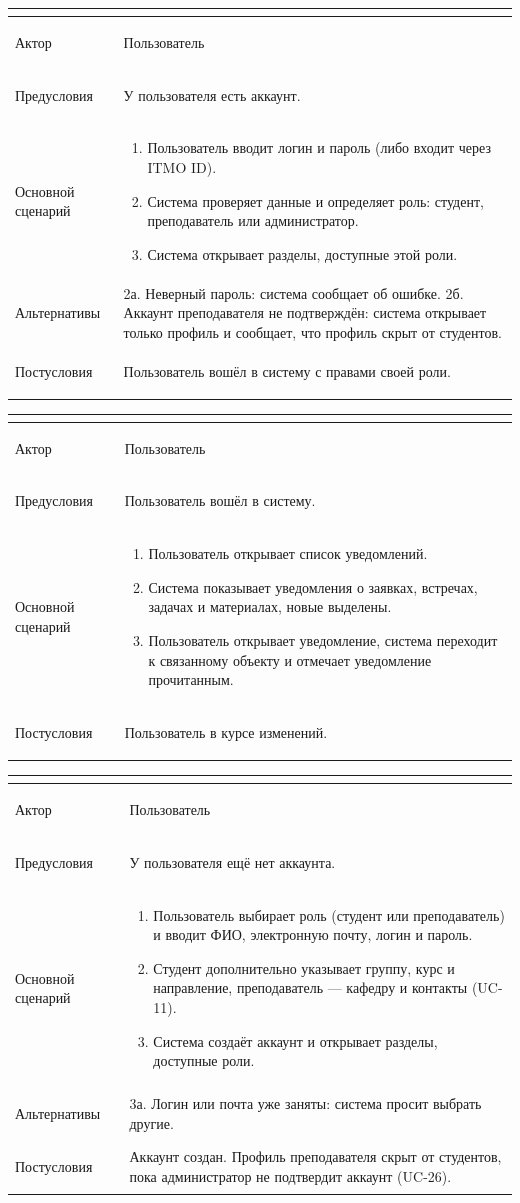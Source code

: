 \documentclass[a4paper,12pt]{article}
\newenvironment{ucd}[3]{%
  \needspace{10\baselineskip}
  \begin{longtable}{|>{\bfseries\raggedright\arraybackslash}p{3.0cm}|p{11.8cm}|}
  \hline
  \multicolumn{2}{|l|}{\textbf{#1.\ #2}}\\ \hline
  Актор & #3\\ \hline
}{\end{longtable}}
\newcommand{\steps}[1]{\begin{enumerate}[nosep,leftmargin=*]#1\end{enumerate}}
\begin{document}
\begin{ucd}{UC-46}{Войти в систему}{Пользователь}
Предусловия & У пользователя есть аккаунт.\\ \hline
Основной сценарий & \steps{
 \item Пользователь вводит логин и пароль (либо входит через ITMO ID).
 \item Система проверяет данные и определяет роль: студент, преподаватель или администратор.
 \item Система открывает разделы, доступные этой роли.}\\ \hline
Альтернативы & 2а. Неверный пароль: система сообщает об ошибке.\newline
2б. Аккаунт преподавателя не подтверждён: система открывает только профиль и сообщает, что профиль скрыт от студентов.\\ \hline
Постусловия & Пользователь вошёл в систему с правами своей роли.\\ \hline
\end{ucd}

\begin{ucd}{UC-47}{Просмотреть уведомления}{Пользователь}
Предусловия & Пользователь вошёл в систему.\\ \hline
Основной сценарий & \steps{
 \item Пользователь открывает список уведомлений.
 \item Система показывает уведомления о заявках, встречах, задачах и материалах, новые выделены.
 \item Пользователь открывает уведомление, система переходит к связанному объекту и отмечает уведомление прочитанным.}\\ \hline
Постусловия & Пользователь в курсе изменений.\\ \hline
\end{ucd}

\begin{ucd}{UC-48}{Зарегистрироваться}{Пользователь}
Предусловия & У пользователя ещё нет аккаунта.\\ \hline
Основной сценарий & \steps{
 \item Пользователь выбирает роль (студент или преподаватель) и вводит ФИО, электронную почту, логин и пароль.
 \item Студент дополнительно указывает группу, курс и направление, преподаватель — кафедру и контакты (UC-11).
 \item Система создаёт аккаунт и открывает разделы, доступные роли.}\\ \hline
Альтернативы & 3а. Логин или почта уже заняты: система просит выбрать другие.\\ \hline
Постусловия & Аккаунт создан. Профиль преподавателя скрыт от студентов, пока администратор не подтвердит аккаунт (UC-26).\\ \hline
\end{ucd}
\end{document}
